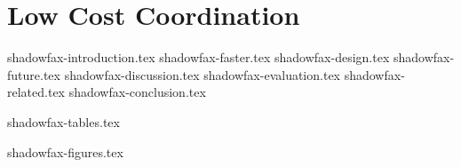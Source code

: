 \chapter{Low Cost Coordination}

 {shadowfax-introduction.tex}
 {shadowfax-faster.tex}
 {shadowfax-design.tex}
 {shadowfax-future.tex}
 {shadowfax-discussion.tex}
 {shadowfax-evaluation.tex}
 {shadowfax-related.tex}
 {shadowfax-conclusion.tex}

\clearpage

 {shadowfax-tables.tex}

\clearpage

 {shadowfax-figures.tex}
